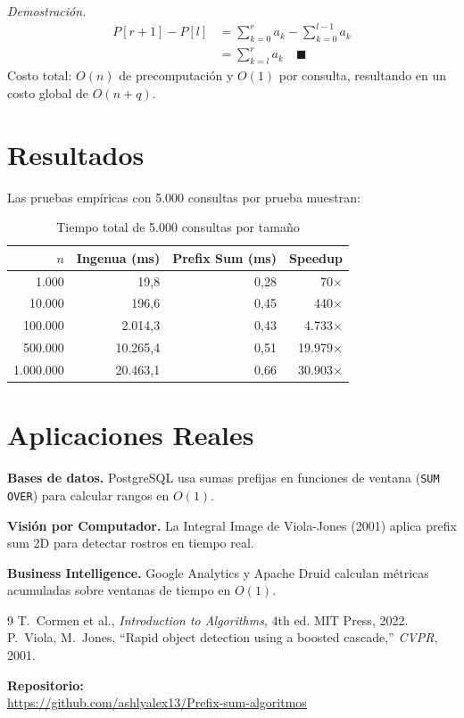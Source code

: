\documentclass[twocolumn]{article}
\begin{document}
\textit{Demostración.}
\begin{align*}
P[r+1] - P[l]
&= \sum_{k=0}^{r} a_k - \sum_{k=0}^{l-1} a_k \\
&= \sum_{k=l}^{r} a_k \quad \blacksquare
\end{align*}
Costo total: $O(n)$ de precomputación y $O(1)$ por consulta, resultando en un costo global de $O(n + q)$.

\section{Resultados}
Las pruebas empíricas con 5.000 consultas por prueba muestran:

\begin{table}[h]
\centering
\small
\begin{tabular}{rrrr}
\toprule
$n$ & Ingenua (ms) & Prefix Sum (ms) & Speedup \\
\midrule
1.000      &     19,8  &   0,28 &      70$\times$ \\
10.000     &    196,6  &   0,45 &     440$\times$ \\
100.000    &  2.014,3  &   0,43 &   4.733$\times$ \\
500.000    & 10.265,4  &   0,51 &  19.979$\times$ \\
1.000.000  & 20.463,1  &   0,66 &  30.903$\times$ \\
\bottomrule
\end{tabular}
\caption{Tiempo total de 5.000 consultas por tamaño}
\end{table}

\section{Aplicaciones Reales}
\textbf{Bases de datos.} PostgreSQL usa sumas prefijas en funciones de
ventana (\texttt{SUM OVER}) para calcular rangos en $O(1)$.

\textbf{Visión por Computador.} La Integral Image de Viola-Jones (2001)
aplica prefix sum 2D para detectar rostros en tiempo real.

\textbf{Business Intelligence.} Google Analytics y Apache Druid calculan
métricas acumuladas sobre ventanas de tiempo en $O(1)$.

\begin{thebibliography}{9}
T.~Cormen et al., \textit{Introduction to Algorithms}, 4th ed. MIT Press, 2022.
P.~Viola, M.~Jones, ``Rapid object detection using a boosted cascade,''
\textit{CVPR}, 2001.
\end{thebibliography}

\vspace{0.5em}
\noindent\textbf{Repositorio:} \\
\small\url{https://github.com/ashlyalex13/Prefix-sum-algoritmos}
\end{document}
